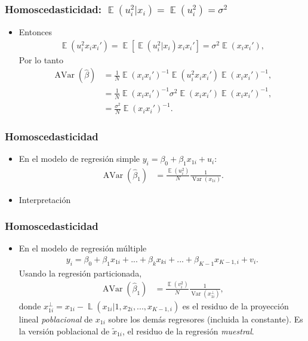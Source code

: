\documentclass[t, compress, spanish, aspectratio=169]{beamer}
\DeclareMathOperator{\Var}{Var}
\DeclareMathOperator{\Avar}{AVar}
\DeclareMathOperator{\E}{\mathbb{E}}
\DeclareMathOperator{\LP}{\mathbb{L}}
\begin{document}
	\begin{frame}
		\frametitle{Homoscedasticidad: $\E(u_i^2|x_i) = \E(u_i^2) = \sigma^2$}
		\begin{itemize}
			\item Entonces
			\begin{align*}
				\E(u_i^2 x_i x_i') = \E[\E(u_i^2|x_i) x_i x_i']=\sigma^2\E(x_i x_i'),
			\end{align*}
			Por lo tanto
			\begin{align*}
				\Avar(\hat \beta)&=\frac{1}{N}\E(x_ix_i')^{-1}\E(u_i^2 x_i x_i')\E(x_ix_i')^{-1},\\
				&=\frac{1}{N}\E(x_ix_i')^{-1}\sigma^2\E(x_i x_i')\E(x_ix_i')^{-1},\\
				&=\frac{\sigma^2}{N}\E(x_ix_i')^{-1}.
			\end{align*}
		\end{itemize}
	\end{frame}
	\begin{frame}
		\frametitle{Homoscedasticidad}
		\begin{itemize}
			\item En el modelo de regresi\'on simple $y_i=\beta_0+\beta_1x_{1i}+u_i$:
			\begin{align*}
				\Avar(\hat \beta_1)&=\frac{\E(u_i^2)}{N}\frac{1}{\Var(x_{1i})}.
			\end{align*}
			\item [] Interpretaci\'on
		\end{itemize}
	\end{frame}

%	
%
	
	\begin{frame}
		\frametitle{Homoscedasticidad}
		\begin{itemize}
			\item En el modelo de regresi\'on m\'ultiple
			\begin{align*}
				y_i = \beta_0+\beta_1x_{1i}+...+\beta_k x_{ki} +...+\beta_{K-1} x_{K-1,i}+ v_i.
			\end{align*}
			Usando la regresi\'on particionada,
			\begin{align*}
				\Avar(\hat \beta_1)&=\frac{\E(v_i^2)}{N}\frac{1}{\Var(x_{1i}^{\perp})},
			\end{align*}
			donde $x_{1i}^{\perp}=x_{1i}-\LP(x_{1i}|1,x_{2i},...,x_{K-1,i})$ es el residuo de la proyecci\'on lineal \emph{poblacional} de $x_{1i}$ sobre los dem\'as regresores (incluida la constante). Es la versi\'on poblacional de $\tilde x_{1i}$, el residuo de la regresi\'on \emph{muestral}.
		\end{itemize}
	\end{frame}
		
\end{document}
